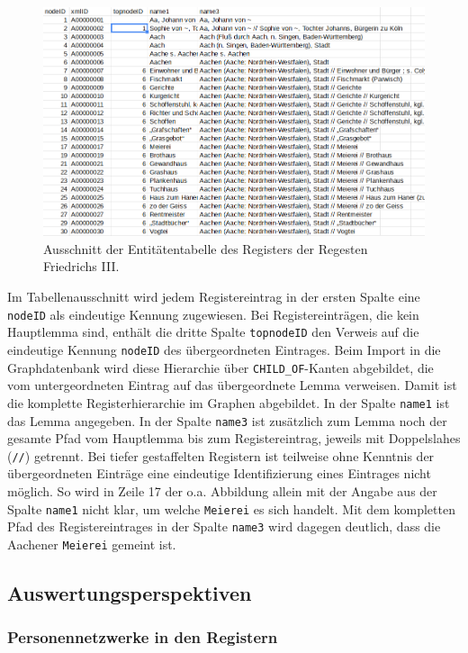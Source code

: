 \documentclass[12pt,ngerman,]{article}
\begin{document}
\begin{figure}
\centering
\includegraphics{Bilder/RI2Graph/RegisterF3-Hierarchie.png}
\caption{Ausschnitt der Entitätentabelle des Registers der Regesten
Friedrichs III.}
\end{figure}

Im Tabellenausschnitt wird jedem Registereintrag in der ersten Spalte
eine \texttt{nodeID} als eindeutige Kennung zugewiesen. Bei
Registereinträgen, die kein Hauptlemma sind, enthält die dritte Spalte
\texttt{topnodeID} den Verweis auf die eindeutige Kennung
\texttt{nodeID} des übergeordneten Eintrages. Beim Import in die
Graphdatenbank wird diese Hierarchie über \texttt{CHILD\_OF}-Kanten
abgebildet, die vom untergeordneten Eintrag auf das übergeordnete Lemma
verweisen. Damit ist die komplette Registerhierarchie im Graphen
abgebildet. In der Spalte \texttt{name1} ist das Lemma angegeben. In der
Spalte \texttt{name3} ist zusätzlich zum Lemma noch der gesamte Pfad vom
Hauptlemma bis zum Registereintrag, jeweils mit Doppelslahes
(\texttt{//}) getrennt. Bei tiefer gestaffelten Registern ist teilweise
ohne Kenntnis der übergeordneten Einträge eine eindeutige
Identifizierung eines Eintrages nicht möglich. So wird in Zeile 17 der
o.a. Abbildung allein mit der Angabe aus der Spalte \texttt{name1} nicht
klar, um welche \texttt{Meierei} es sich handelt. Mit dem kompletten
Pfad des Registereintrages in der Spalte \texttt{name3} wird dagegen
deutlich, dass die Aachener \texttt{Meierei} gemeint ist.

\subsection{Auswertungsperspektiven}\label{auswertungsperspektiven}

\subsubsection{Personennetzwerke in den
Registern}\label{personennetzwerke-in-den-registern}
\end{document}
